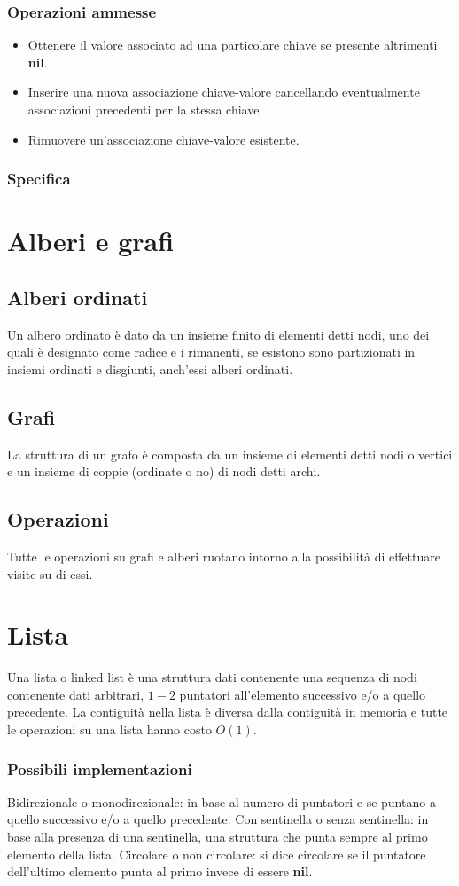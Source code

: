\subsubsection{Operazioni ammesse}
\begin{itemize}
\item Ottenere il valore associato ad una particolare chiave se presente altrimenti \textbf{nil}.
\item Inserire una nuova associazione chiave-valore cancellando eventualmente associazioni precedenti per la stessa chiave.
\item Rimuovere un'associazione chiave-valore esistente.
\end{itemize}
\subsubsection{Specifica}

\section{Alberi e grafi}
\subsection{Alberi ordinati}
Un albero ordinato \`e dato da un insieme finito di elementi detti nodi, uno dei quali \`e designato come radice e i rimanenti, se esistono sono 
partizionati in insiemi ordinati e disgiunti, anch'essi alberi ordinati.
\subsection{Grafi}
La struttura di un grafo \`e composta da un insieme di elementi detti nodi o vertici e un insieme di coppie (ordinate o no) di nodi detti archi.
\subsection{Operazioni}
Tutte le operazioni su grafi e alberi ruotano intorno alla possibilit\`a di effettuare visite su di essi.
\section{Lista}
Una lista o linked list \`e una struttura dati contenente una sequenza di nodi contenente dati arbitrari, $1-2$ puntatori all'elemento successivo e/o a 
quello precedente. La contiguit\`a nella lista \`e diversa dalla contiguit\`a in memoria e tutte le operazioni su una lista hanno costo $O(1)$.
\subsubsection{Possibili implementazioni}
Bidirezionale o monodirezionale: in base al numero di puntatori e se puntano a quello successivo e/o a quello precedente.
Con sentinella o senza sentinella: in base alla presenza di una sentinella, una struttura che punta sempre al primo elemento della lista.
Circolare o non circolare: si dice circolare se il puntatore dell'ultimo elemento punta al primo invece di essere \textbf{nil}.
